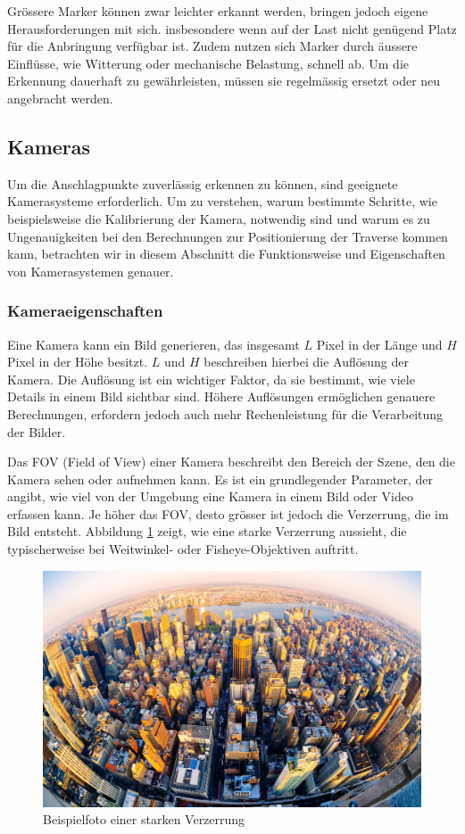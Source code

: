 Grössere Marker können zwar leichter erkannt werden, bringen jedoch eigene Herausforderungen mit sich. 
insbesondere wenn auf der Last nicht genügend Platz für die Anbringung verfügbar ist. Zudem nutzen 
sich Marker durch äussere Einflüsse, wie Witterung oder mechanische Belastung, schnell ab. Um die 
Erkennung dauerhaft zu gewährleisten, müssen sie regelmässig ersetzt oder neu angebracht werden.



\subsection{Kameras}
Um die Anschlagpunkte zuverlässig erkennen zu können, sind geeignete Kamerasysteme
erforderlich. Um zu verstehen, warum bestimmte Schritte, wie beispielsweise die 
Kalibrierung der Kamera, notwendig sind und warum es zu Ungenauigkeiten bei den 
Berechnungen zur Positionierung der Traverse kommen kann, betrachten wir in diesem 
Abschnitt die Funktionsweise und Eigenschaften von Kamerasystemen genauer.

\subsubsection{Kameraeigenschaften}
Eine Kamera kann ein Bild generieren, das insgesamt \( L \) Pixel in 
der Länge und \( H \) Pixel in der Höhe besitzt. \( L \) und \( H \) 
beschreiben hierbei die Auflösung der Kamera. Die Auflösung ist ein 
wichtiger Faktor, da sie bestimmt, wie viele Details in einem Bild 
sichtbar sind. Höhere Auflösungen ermöglichen genauere Berechnungen, 
erfordern jedoch auch mehr Rechenleistung für die Verarbeitung der 
Bilder.

Das FOV (Field of View) einer Kamera beschreibt den Bereich der Szene,
den die Kamera sehen oder aufnehmen kann. Es ist ein grundlegender 
Parameter, der angibt, wie viel von der Umgebung eine Kamera in einem 
Bild oder Video erfassen kann. Je höher das FOV, desto grösser ist 
jedoch die Verzerrung, die im Bild entsteht.
Abbildung \ref{fig:fisheye} zeigt, wie eine starke Verzerrung aussieht,
die typischerweise bei Weitwinkel- oder Fisheye-Objektiven auftritt.

\begin{figure}[H]
    \centering
    \includegraphics[width=0.5\linewidth]{graphics/fisheye.jpg}
    \caption{Beispielfoto einer starken Verzerrung}
    \label{fig:fisheye}
\end{figure}

